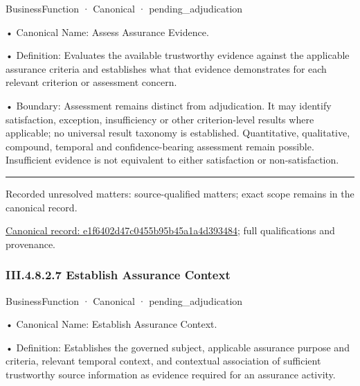 \label{element:e1f6402d47c0455b95b45a1a4d393484}
{\small BusinessFunction · Canonical · pending\_adjudication}\par

•
Canonical Name: Assess Assurance Evidence.



•
Definition: Evaluates the available trustworthy evidence against the applicable assurance criteria and establishes what that evidence demonstrates for each relevant criterion or assessment concern.



•
Boundary: Assessment remains distinct from adjudication. It may identify satisfaction, exception, insufficiency or other criterion-level results where applicable; no universal result taxonomy is established. Quantitative, qualitative, compound, temporal and confidence-bearing assessment remain possible. Insufficient evidence is not equivalent to either satisfaction or non-satisfaction.



\medskip\hrule\medskip

{\small Recorded unresolved matters: source-qualified matters; exact scope remains in the canonical record.}\par
{\footnotesize \href{../../../../../../../../continuum/business/business-function/e1f6402d47c0455b95b45a1a4d393484.md}{Canonical record: e1f6402d47c0455b95b45a1a4d393484}; full qualifications and provenance.}\par
\subsubsection*{III.4.8.2.7 Establish Assurance Context}
\label{navigation:III.4.8.2.7}

\label{element:ffffe352e28c4e878d986b0e15ddff15}
{\small BusinessFunction · Canonical · pending\_adjudication}\par

•
Canonical Name: Establish Assurance Context.



•
Definition: Establishes the governed subject, applicable assurance purpose and criteria, relevant temporal context, and contextual association of sufficient trustworthy source information as evidence required for an assurance activity.



